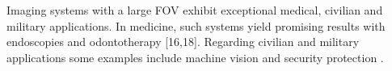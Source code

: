 Imaging systems with a large FOV exhibit exceptional medical, civilian and military applications. In medicine, such systems yield promising results with endoscopies and odontotherapy [16,18]. Regarding civilian and military applications some examples include machine vision and security protection \cite{davis2009bio,duparre2007latest}.\\